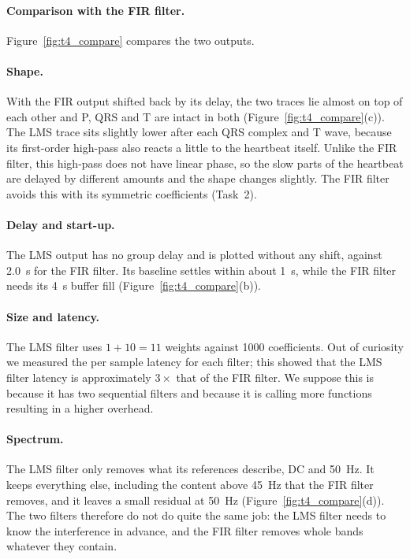 \documentclass[11pt,a4paper]{article}
\newcommand{\fix}[1]{#1}
\begin{document}
\paragraph{Comparison with the FIR filter.}
Figure~\ref{fig:t4_compare} compares the two outputs.

\paragraph{\fix{Shape.}} With the FIR output shifted back by its delay, the two traces lie almost on top of each other and P, QRS and T are intact in both (Figure~\ref{fig:t4_compare}(c)).
The LMS trace sits slightly lower after each QRS complex and T wave, because its first-order high-pass also reacts a little to the heartbeat itself.
\fix{Unlike the FIR filter, this high-pass does not have linear phase, so the slow parts of the heartbeat are delayed by different amounts and the shape changes slightly.
The FIR filter avoids this with its symmetric coefficients (Task~2).}
\paragraph{\fix{Delay and start-up.}} The LMS output has no group delay and is plotted without any shift, against \SI{2.0}{\second} for the FIR filter.
Its baseline settles within about \SI{1}{\second}, while the FIR filter needs its \SI{4}{\second} buffer fill (Figure~\ref{fig:t4_compare}(b)).

\paragraph{\fix{Size and latency.}} The LMS filter uses $1 + 10 = 11$ weights against 1000 coefficients. Out of curiosity we measured the per sample latency for each filter; this showed that the LMS filter latency is approximately $3\times$ that of the FIR filter. We suppose this is because it has two sequential filters and because it is calling more functions resulting in a higher overhead.

\paragraph{\fix{Spectrum.}} The LMS filter only removes what its references describe, DC and \SI{50}{\hertz}.
It keeps everything else, including the content above \SI{45}{\hertz} that the FIR filter removes, and it leaves a small residual at \SI{50}{\hertz} (Figure~\ref{fig:t4_compare}(d)).
The two filters therefore do not do quite the same job: the LMS filter needs to know the interference in advance, and the FIR filter removes whole bands whatever they contain.
\end{document}
